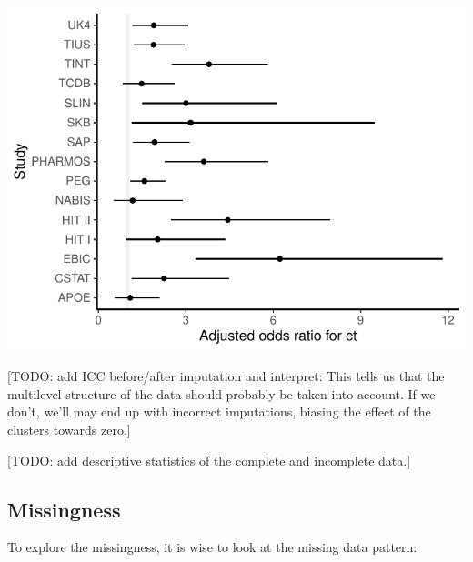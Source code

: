 \documentclass[
]{jss}
\begin{document}
\begin{CodeChunk}


\begin{center}\includegraphics{Imputation_of_Incomplete_Multilevel_Data_files/figure-latex/forest-1} \end{center}

\end{CodeChunk}

{[}TODO: add ICC before/after imputation and interpret: This tells us
that the multilevel structure of the data should probably be taken into
account. If we don't, we'll may end up with incorrect imputations,
biasing the effect of the clusters towards zero.{]}

{[}TODO: add descriptive statistics of the complete and incomplete
data.{]}

\hypertarget{missingness}{%
\subsection{Missingness}\label{missingness}}

To explore the missingness, it is wise to look at the missing data
pattern:
\end{document}
